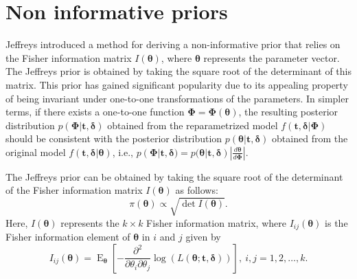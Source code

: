 \documentclass[]{interact}
\newcommand{\f}{\operatorname}
\theoremstyle{plain}%
\theoremstyle{definition}
\theoremstyle{remark}
\begin{document}
\section{Non informative priors}\label{sec:3}



Jeffreys \cite{jeffreys1946invariant} introduced a method for deriving a non-informative prior that relies on the Fisher information matrix $I(\boldsymbol{\theta})$, where $\boldsymbol{\theta}$ represents the parameter vector. The Jeffreys prior is obtained by taking the square root of the determinant of this matrix. This prior has gained significant popularity due to its appealing property of being invariant under one-to-one transformations of the parameters. In simpler terms, if there exists a one-to-one function $\boldsymbol{\Phi}=\boldsymbol{\Phi}(\boldsymbol{\theta})$, the resulting posterior distribution $p(\boldsymbol{\Phi}|\boldsymbol{t,\delta})$ obtained from the reparametrized model $f(\boldsymbol{t,\delta}|\boldsymbol{\Phi})$ should be consistent with the posterior distribution $p(\boldsymbol{\theta}|\boldsymbol{t,\delta})$ obtained from the original model $f(\boldsymbol{t,\delta}|\boldsymbol{\theta})$, i.e., $p(\boldsymbol{\Phi}|\boldsymbol{t,\delta})=p(\boldsymbol{\theta}|\boldsymbol{t,\delta})|\frac{d\boldsymbol{\theta}}{d\boldsymbol{\Phi}}|$.

The Jeffreys prior can be obtained by taking the square root of the determinant of the Fisher information matrix $I(\boldsymbol{\theta})$ as follows:
\begin{equation}\label{jeffreysp} 
\pi(\boldsymbol{\theta})\propto \sqrt{\det I(\boldsymbol{\theta})}.
\end{equation}
Here, $I(\boldsymbol{\theta})$ represents the $k\times k$ Fisher information matrix, where $I_{ij}(\boldsymbol{\theta})$ is the Fisher information element of $\boldsymbol{\theta}$ in $i$ and $j$  given by
\begin{equation*}%
I_{ij}(\boldsymbol{\theta})=\f{E}_{\boldsymbol{\theta}}\left[-\frac{\partial^2}{\partial \theta_i \partial \theta_j}\log(L(\boldsymbol{\theta};\boldsymbol{t,\delta}))\right],\ i,j=1,2,\ldots,k.
\end{equation*}
\end{document}
